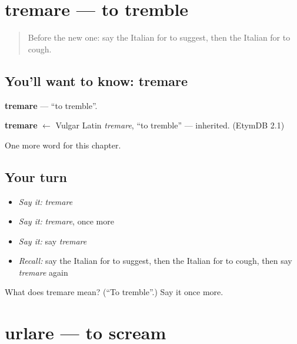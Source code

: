 \section[tremare]{tremare — to tremble}

\label{lesson:IT-C214-tremare}



\begin{quote}
Before the new one: say the Italian for to suggest, then the Italian for to cough.
\end{quote}

\subsection*{You'll want to know: tremare}
\textbf{tremare} — \textquotedblleft{}to tremble\textquotedblright{}.

\begin{cousinweb}
\textbf{tremare} $\leftarrow$ Vulgar Latin \emph{tremare}, \textquotedblleft{}to tremble\textquotedblright{} — inherited. (EtymDB 2.1)
\end{cousinweb}

\begin{grammarlens}[title={What you've built}]
One more word for this chapter.
\end{grammarlens}

\subsection*{Your turn}
\begin{itemize}
\raggedright
  \item \emph{Say it:} \emph{tremare}
  \item \emph{Say it:} \emph{tremare}, once more
  \item \emph{Say it:} say \emph{tremare}
  \item \emph{Recall:} say the Italian for to suggest, then the Italian for to cough, then say \emph{tremare} again
\end{itemize}

\begin{tcolorbox}[breakable,colback=teal!4,colframe=teal!35!black,title={Before you move on}]
What does tremare mean? (\textquotedblleft{}To tremble\textquotedblright{}.) Say it once more.
\end{tcolorbox}
\section[urlare]{urlare — to scream}

